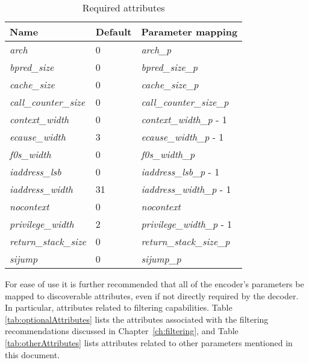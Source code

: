 \begin{table}[!h]
    \centering
    \caption{Required attributes}
    \label{tab:requiredAttributes}
    \begin{tabulary}{\textwidth}{|l|l|p{80mm}|}
        \hline
        \textbf{Name} & \textbf{Default} & \textbf{Parameter mapping} \\
        \hline
        \textit{arch} & 0 & \textit{arch\_p} \\
        \hline
        \textit{bpred\_size} & 0 & \textit{bpred\_size\_p}  \\
        \hline
        \textit{cache\_size} & 0 & \textit{cache\_size\_p} \\
        \hline
        \textit{call\_counter\_size} & 0 & \textit{call\_counter\_size\_p} \\
        \hline
        \textit{context\_width} & 0 & \textit{context\_width\_p} - 1 \\
        \hline
        \textit{ecause\_width} & 3 & \textit{ecause\_width\_p} - 1 \\
        \hline
        \textit{f0s\_width} & 0 & \textit{f0s\_width\_p} \\
        \hline
        \textit{iaddress\_lsb} & 0 & \textit{iaddress\_lsb\_p} - 1 \\
        \hline
        \textit{iaddress\_width} & 31 & \textit{iaddress\_width\_p} - 1 \\
        \hline
        \textit{nocontext} & 0 & \textit{nocontext} \\
        \hline
        \textit{privilege\_width} & 2 & \textit{privilege\_width\_p} - 1 \\
        \hline
        \textit{return\_stack\_size} & 0 & \textit{return\_stack\_size\_p} \\
        \hline
        \textit{sijump} & 0 & \textit{sijump\_p} \\
        \hline
    \end{tabulary}
\end{table}

For ease of use it is further recommended that all of the encoder's parameters be mapped to 
discoverable attributes, even if not directly required by the decoder.  In particular, 
attributes related to filtering capabilities.  Table \ref{tab:optionalAttributes} lists the attributes
associated with the filtering recommendations discussed in Chapter~\ref{ch:filtering}, and 
Table \ref{tab:otherAttributes} lists attributes related to other parameters mentioned in this 
document.

